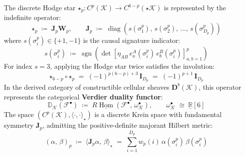 \documentclass[
    12pt,
    a4paper,
    headings=normal,
    twoside=false,
    open=any,
    parskip=half
]{scrbook}
\DeclareMathOperator{\Hom}{Hom}
\begin{document}
\begin{phystheorem}\label{thm:ch1_indefinite_discrete_hodge_star}
The discrete Hodge star $\boldsymbol{\star}_p \colon C^p(\mathcal{K}) \to C^{6-p}(\star\mathcal{K})$ is represented by the indefinite operator:
\begin{equation}
\boldsymbol{\star}_p \;\coloneqq\; \mathbf{J}_p \mathbf{W}_p, \qquad \mathbf{J}_p \;\coloneqq\; \operatorname{diag}\left( s(\sigma^p_1), \, s(\sigma^p_2), \, \dots, \, s(\sigma^p_{D_p}) \right)
\label{eq:ch1_indefinite_hodge_star_matrix}
\end{equation}
where $s(\sigma^p_i) \in \{+1, -1\}$ is the causal signature indicator:
\begin{equation}
s\left(\sigma^p_i\right) \;\coloneqq\; \operatorname{sgn}\left( \det\left[ \eta_{AB} \, e^A_a(\sigma^p_i) \, e^B_b(\sigma^p_i) \right]_{a,b=1}^p \right)
\end{equation}
For index $s = 3$, applying the Hodge star twice satisfies the involution:
\begin{equation}
\boldsymbol{\star}_{6-p} \circ \boldsymbol{\star}_p \;=\; (-1)^{p(6-p) + 3} \, \mathbf{I}_{D_p} \;=\; (-1)^{p + 1} \, \mathbf{I}_{D_p}
\label{eq:ch1_double_hodge_involution}
\end{equation}
In the derived category of constructible cellular sheaves $\mathbf{D}^b(\mathcal{K})$, this operator represents the categorical \textbf{Verdier duality functor}:
\begin{equation}
\mathbb{D}_{\mathcal{K}}(\mathscr{F}^\bullet) \;\coloneqq\; R\underline{\Hom}(\mathscr{F}^\bullet, \, \omega_{\mathcal{K}}^\bullet), \qquad \omega_{\mathcal{K}}^\bullet \;\cong\; \underline{\mathbb{R}}[6]
\end{equation}
The space $(C^p(\mathcal{K}), \langle \cdot, \cdot \rangle_{\boldsymbol{\star}})$ is a discrete Krein space with fundamental symmetry $\mathbf{J}_p$, admitting the positive-definite majorant Hilbert metric:
\begin{equation}
(\alpha, \, \beta)_p \;\coloneqq\; \langle \mathbf{J}_p \alpha, \, \beta \rangle_{\boldsymbol{\star}} \;=\; \sum_{i=1}^{D_p} w_p(i) \, \alpha(\sigma^p_i) \, \beta(\sigma^p_i)
\label{eq:ch1_majorant_hilbert_metric}
\end{equation}
\end{phystheorem}
\end{document}
